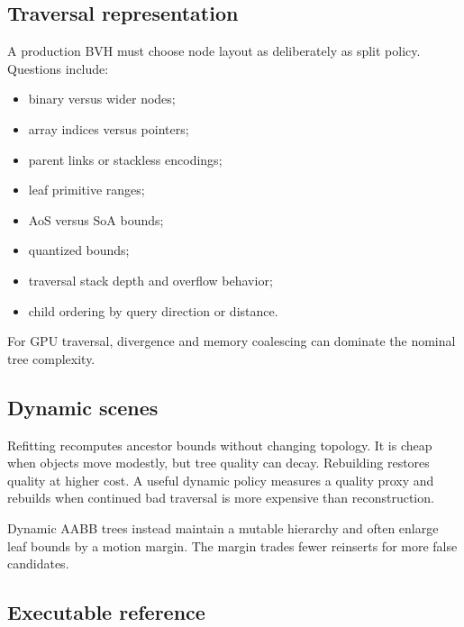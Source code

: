 \subsection{Traversal representation}\label{appendix-5653a7aea6bb-traversal-representation}

\hypertarget{appendix-5653a7aea6bb-traversal-representation}{}

A production BVH must choose node layout as deliberately as split policy. Questions include:

\begin{itemize}
\tightlist
\item
  binary versus wider nodes;
\item
  array indices versus pointers;
\item
  parent links or stackless encodings;
\item
  leaf primitive ranges;
\item
  AoS versus SoA bounds;
\item
  quantized bounds;
\item
  traversal stack depth and overflow behavior;
\item
  child ordering by query direction or distance.
\end{itemize}

For GPU traversal, divergence and memory coalescing can dominate the nominal tree complexity.

\subsection{Dynamic scenes}\label{appendix-5653a7aea6bb-dynamic-scenes}

\hypertarget{appendix-5653a7aea6bb-dynamic-scenes}{}

Refitting recomputes ancestor bounds without changing topology. It is cheap when objects move modestly, but tree quality can decay. Rebuilding restores quality at higher cost. A useful dynamic policy measures a quality proxy and rebuilds when continued bad traversal is more expensive than reconstruction.

Dynamic AABB trees instead maintain a mutable hierarchy and often enlarge leaf bounds by a motion margin. The margin trades fewer reinserts for more false candidates.

\subsection{Executable reference}\label{appendix-5653a7aea6bb-executable-reference}

